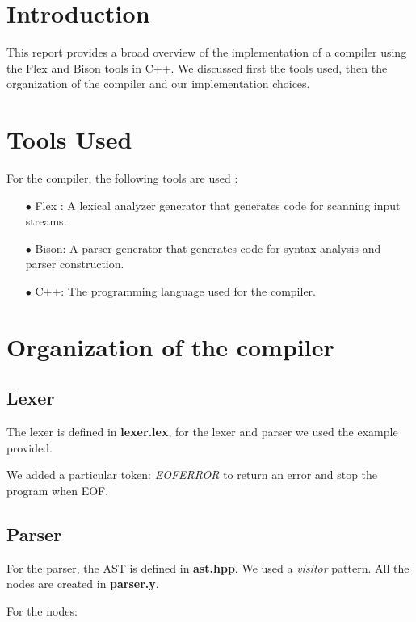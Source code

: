 \documentclass[11pt]{article}
\begin{document}
\section{Introduction}

\par This report provides a broad overview of the implementation of a compiler using the Flex and Bison tools in C++. We discussed first the tools used, then the organization of the compiler and our implementation choices.

\section{Tools Used}

For the compiler, the following tools are used :
\begin{itemize}

    \item[$\bullet$] Flex : A lexical analyzer generator that generates code for scanning input streams.

    \item[$\bullet$] Bison: A parser generator that generates code for syntax analysis and parser construction.

    \item[$\bullet$] C++: The programming language used for the compiler.
\end{itemize}

\section{Organization of the compiler}
\subsection{Lexer}
The lexer is defined in \textbf{lexer.lex}, for the lexer and parser we used the example provided. 

We added a particular token: \textit{EOFERROR} to return an error and stop the program when EOF. 

\subsection{Parser}

For the parser, the AST is defined in \textbf{ast.hpp}. We used a \textit{visitor} pattern. All the nodes are created in \textbf{parser.y}.

For the nodes:
\end{document}
